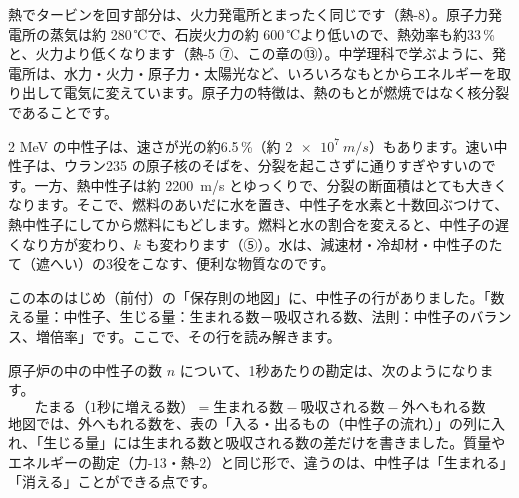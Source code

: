 熱でタービンを回す部分は、火力発電所とまったく同じです（熱-8）。原子力発電所の蒸気は約 280\,℃で、石炭火力の約 600\,℃より低いので、熱効率も約33\,\%と、火力より低くなります（熱-5 ⑦、この章の⑬）。中学理科で学ぶように、発電所は、水力・火力・原子力・太陽光など、いろいろなもとからエネルギーを取り出して電気に変えています。原子力の特徴は、熱のもとが燃焼ではなく核分裂であることです。

2 MeV の中性子は、速さが光の約6.5\,\%（約 $\qty{2e7}{m/s}$）もあります。速い中性子は、ウラン235 の原子核のそばを、分裂を起こさずに通りすぎやすいのです。一方、熱中性子は約 \qty{2200}{m/s} とゆっくりで、分裂の断面積はとても大きくなります。そこで、燃料のあいだに水を置き、中性子を水素と十数回ぶつけて、熱中性子にしてから燃料にもどします。燃料と水の割合を変えると、中性子の遅くなり方が変わり、$k$ も変わります（⑤）。水は、減速材・冷却材・中性子のたて（遮へい）の3役をこなす、便利な物質なのです。


\label{ph:原-15:sec4}
この本のはじめ（前付）の「保存則の地図」に、中性子の行がありました。「数える量：中性子、生じる量：生まれる数－吸収される数、法則：中性子のバランス、増倍率」です。ここで、その行を読み解きます。

原子炉の中の中性子の数 $n$ について、1秒あたりの勘定は、次のようになります。
\[ \text{たまる（1秒に増える数）}=\text{生まれる数}-\text{吸収される数}-\text{外へもれる数} \]
地図では、外へもれる数を、表の「入る・出るもの（中性子の流れ）」の列に入れ、「生じる量」には生まれる数と吸収される数の差だけを書きました。質量やエネルギーの勘定（力-13・熱-2）と同じ形で、違うのは、中性子は「生まれる」「消える」ことができる点です。

